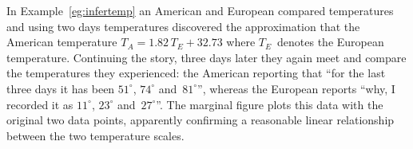 \begin{example} \label{eg:infertemp2}
In Example~\ref{eg:infertemp} an American and European compared temperatures and using two days temperatures discovered the approximation that the American temperature \(T_A=1.82\,T_E+32.73\) where \(T_E\)~denotes the European temperature.
Continuing the story, three days later they again meet and compare the temperatures they experienced: the American reporting that ``for the last three days it has been \(51^\circ\), \(74^\circ\) and~\(81^\circ\)'', whereas the European reports ``why, I recorded it as \(11^\circ\), \(23^\circ\) and~\(27^\circ\)''.
The marginal figure plots this data with the original two data points, apparently confirming a reasonable linear relationship between the two temperature scales.


\end{example}
